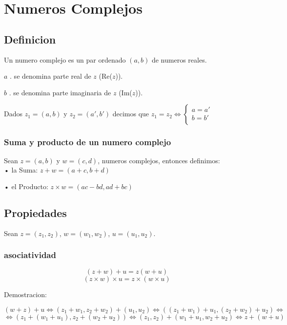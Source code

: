 \chapter{Numeros Complejos}

\section{Definicion}
Un numero complejo es un par ordenado $(a,b)$ de numeros reales.

$a$ . se denomina parte real de $z$ (Re($z$)).

$b$ . se denomina parte imaginaria de $z$ (Im($z$)).

Dados $z_1 = (a,b)$ y $z_2=(a',b')$ decimos que $z_1=z_2 \Leftrightarrow
\left\{ \begin{array}{c}
a = a' \\
b = b'\\

\end{array} \right. $\\

\subsection{Suma y producto de un numero complejo}

Sean $z=(a,b)$ y $w=(c,d)$, numeros complejos, entonces definimos:\\

• la Suma: $z+w = (a+c, b+d)$

• el Producto: $z \times w = (ac-bd, ad+bc)$

\section{Propiedades}

Sean $z=(z_1,z_2)$, $w=(w_1,w_2)$, $u=(u_1,u_2)$.\\ 

\subsection{asociatividad}
$$(z+w)+u=z(w+u)$$
$$(z\times w)\times u = z \times( w \times u)$$

Demostracion:

$$(w+z)+u \Leftrightarrow (z_1+w_1,z_2+w_2)+(u_1,u_2) \Leftrightarrow ((z_1+w_1)+u_1,(z_2+w_2)+u_2)\Leftrightarrow $$
$$ \Leftrightarrow (z_1+(w_1+u_1),z_2+(w_2+u_2)) \Leftrightarrow (z_1,z_2)+(w_1+u_1,w_2+u_2) \Leftrightarrow z+(w+u)$$

